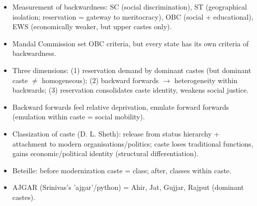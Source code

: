\begin{QuickRevision}
\begin{itemize}
\item Measurement of backwardness: SC (social discrimination), ST (geographical isolation; reservation = gateway to meritocracy), OBC (social + educational), EWS (economically weaker, but upper castes only).
\item Mandal Commission set OBC criteria, but every state has its own criteria of backwardness.
\item Three dimensions: (1) reservation demand by dominant castes (but dominant caste $\neq$ homogeneous); (2) backward forwards $\rightarrow$ heterogeneity within backwards; (3) reservation consolidates caste identity, weakens social justice.
\item Backward forwards feel relative deprivation, emulate forward forwards (emulation within caste = social mobility).
\item Classization of caste (D. L. Sheth): release from status hierarchy + attachment to modern organisations/politics; caste loses traditional functions, gains economic/political identity (structural differentiation).
\item Beteille: before modernization caste = class; after, classes within caste.
\item AJGAR (Srinivas's 'ajgar'/python) = Ahir, Jat, Gujjar, Rajput (dominant castes).
\end{itemize}
\end{QuickRevision}

